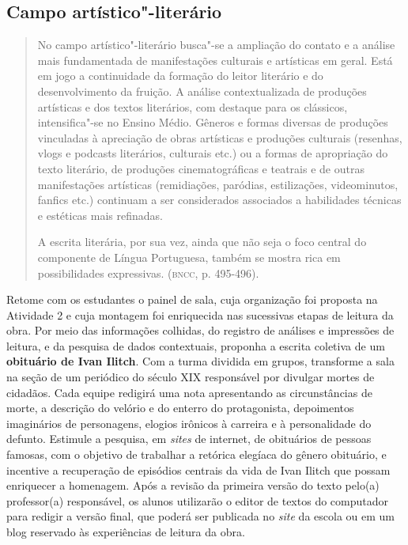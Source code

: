 \documentclass{extarticle}
\begin{document}
\subsection{Campo artístico"-literário}

\begin{quote}
No campo artístico"-literário busca"-se a ampliação do contato e a
análise mais fundamentada de manifestações culturais e artísticas em
geral. Está em jogo a continuidade da formação do leitor literário e do
desenvolvimento da fruição. A análise contextualizada de produções
artísticas e dos textos literários, com destaque para os clássicos,
intensifica"-se no Ensino Médio. Gêneros e formas diversas de produções
vinculadas à apreciação de obras artísticas e produções culturais
(resenhas, vlogs e podcasts literários, culturais etc.) ou a formas de
apropriação do texto literário, de produções cinematográficas e teatrais
e de outras manifestações artísticas (remidiações, paródias,
estilizações, videominutos, fanfics etc.) continuam a ser considerados
associados a habilidades técnicas e estéticas mais refinadas.

A escrita literária, por sua vez, ainda que não seja o foco central do
componente de Língua Portuguesa, também se mostra rica em possibilidades
expressivas. (\textsc{bncc}, p. 495-496).
\end{quote}

Retome com os estudantes o painel de sala, cuja organização foi
proposta na Atividade 2 e cuja montagem foi enriquecida nas sucessivas
etapas de leitura da obra. Por meio das informações colhidas, do
registro de análises e impressões de leitura, e da pesquisa de dados
contextuais, proponha a escrita coletiva de um \textbf{obituário de
Ivan Ilitch}. Com a turma dividida em grupos, transforme a sala na
seção de um periódico do século XIX responsável por divulgar mortes de
cidadãos. Cada equipe redigirá uma nota apresentando as circunstâncias
de morte, a descrição do velório e do enterro do protagonista,
depoimentos imaginários de personagens, elogios irônicos à carreira e
à personalidade do defunto. Estimule a pesquisa, em \emph{sites} de
internet, de obituários de pessoas famosas, com o objetivo de
trabalhar a retórica elegíaca do gênero obituário, e incentive a
recuperação de episódios centrais da vida de Ivan Ilitch que possam
enriquecer a homenagem. Após a revisão da primeira versão do texto
pelo(a) professor(a) responsável, os alunos utilizarão o editor de
textos do computador para redigir a versão final, que poderá ser
publicada no \emph{site} da escola ou em um blog reservado às
experiências de leitura da obra.
\end{document}
